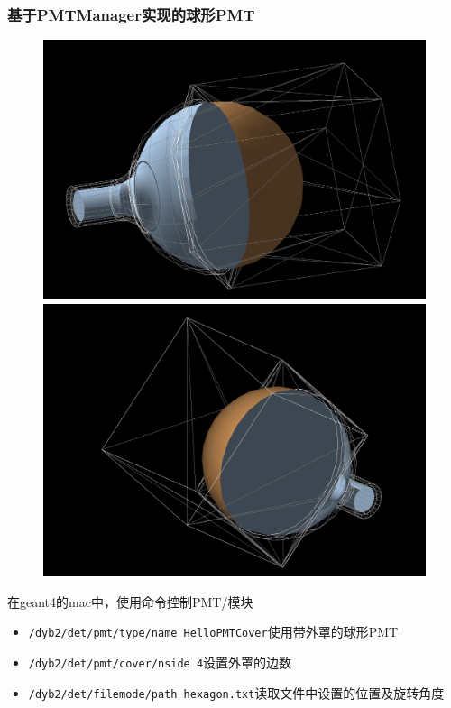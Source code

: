 \begin{frame}
    \frametitle{基于PMTManager实现的球形PMT}
    \begin{figure}
        \centering
        \includegraphics[width=.5\textwidth,keepaspectratio]{data/newpmt-6-sides.png}
        \includegraphics[width=.5\textwidth,keepaspectratio]{data/newpmt-4-sides.png}
    \end{figure}
    在geant4的mac中，使用命令控制PMT/模块
    \begin{itemize}
        \item {\tt /dyb2/det/pmt/type/name HelloPMTCover}使用带外罩的球形PMT
        \item {\tt /dyb2/det/pmt/cover/nside 4}设置外罩的边数
        \item {\tt /dyb2/det/filemode/path
            hexagon.txt}读取文件中设置的位置及旋转角度
    \end{itemize}
\end{frame}

